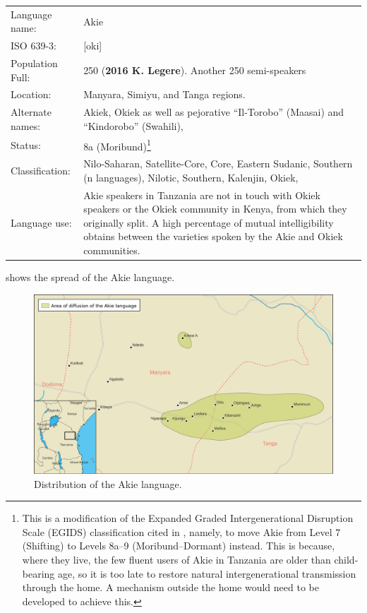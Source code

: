 \documentclass[output=paper,colorlinks,citecolor=brown]{langscibook}
\begin{document}
\begin{tabular}{p{3cm} p{8cm}}
Language name: & Akie \\
ISO 639-3: &  	 [oki] \\
Population Full:	&  250 (\textbf{2016 K. Legere}). Another 250 semi-speakers \\
Location:	& 	Manyara, Simiyu, and Tanga regions. \\
Alternate names: & Akiek, Okiek as well as pejorative “Il-Torobo” (Maasai) and “Kindorobo” (Swahili), \\
Status: & 	8a (Moribund)\footnote{This is a modification of the Expanded Graded Intergenerational Disruption Scale (EGIDS) classification cited in \citet[7]{SimonsFennig2018}, namely, to move Akie from Level 7 (Shifting) to Levels 8a–9 (Moribund–Dormant) instead. This is because, where they live, the few fluent users of Akie in Tanzania are older than child-bearing age, so it is too late to restore natural intergenerational transmission through the home. A mechanism outside the home would need to be developed to achieve this.} \\
Classification:	 & Nilo-Saharan, Satellite-Core, Core, Eastern Sudanic, Southern (n languages), Nilotic, Southern, Kalenjin, Okiek, \\
Language use: & 	Akie speakers in Tanzania are not in touch with Okiek speakers or the Okiek community in Kenya, from which they originally split. A high percentage of mutual intelligibility obtains between the varieties spoken by the Akie and Okiek communities. \\
\end{tabular}

 shows the spread of the Akie language.



\begin{figure}
    \includegraphics[width=\textwidth]{figures/akie_language_map.pdf}
    \caption{Distribution of the Akie language.\label{fig:legere:1}}
\end{figure}
\end{document}
